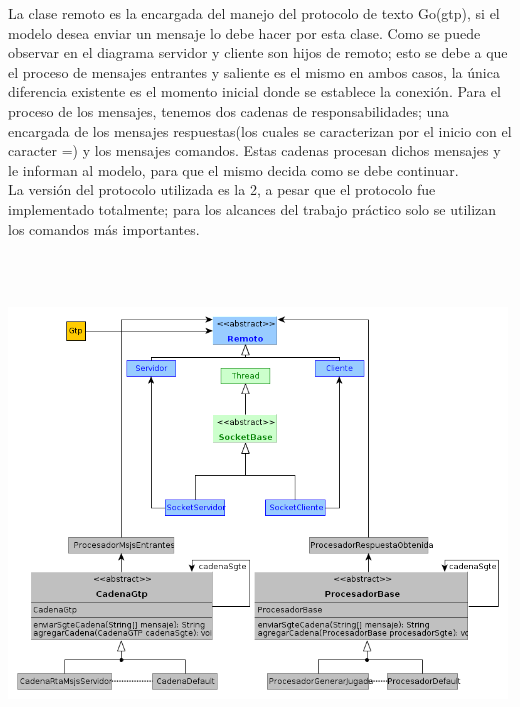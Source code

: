 La clase remoto es la encargada del manejo del protocolo de texto Go(gtp), si el modelo desea enviar un mensaje lo debe hacer por esta clase. Como se puede observar en el diagrama servidor y cliente son hijos de remoto; esto se debe a que el proceso de mensajes entrantes y saliente es el mismo en ambos casos, la \'unica diferencia existente es el momento inicial donde se establece la conexi\'on. Para el proceso de los mensajes, tenemos dos cadenas de responsabilidades; una encargada de los mensajes respuestas(los cuales se caracterizan por el inicio con el caracter =) y los mensajes comandos. Estas cadenas procesan dichos mensajes y le informan al modelo, para que el mismo decida como se debe continuar. \\
La versi\'on del protocolo utilizada es la 2, a pesar que el protocolo fue implementado totalmente; para los alcances del trabajo pr\'actico solo se utilizan los comandos m\'as importantes.

\begin{center}
 \includegraphics[width=500,height=500]{./Diagramas/DiagramaRemoto/diagrama_remoto.png}
\end{center}

